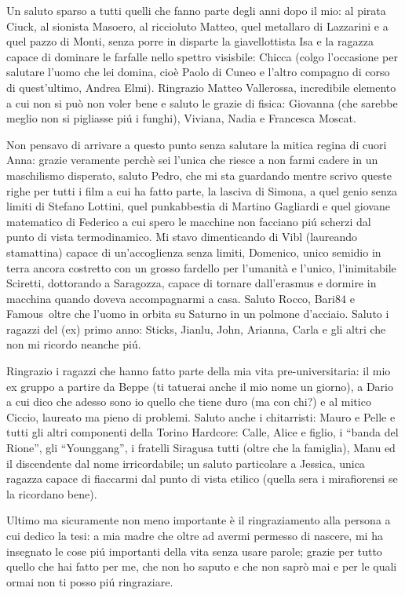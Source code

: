 \par 
Un saluto sparso a tutti quelli che fanno parte degli  anni dopo il mio: al pirata Ciuck, al sionista Masoero, al riccioluto Matteo, quel metallaro di Lazzarini e a quel pazzo di Monti, senza porre in disparte la giavellottista  Isa e la ragazza capace di dominare le farfalle nello spettro visisbile: Chicca (colgo l'occasione per salutare l'uomo che lei domina, cio\`e Paolo di Cuneo e l'altro compagno di corso di quest'ultimo, Andrea Elmi). Ringrazio Matteo Vallerossa, incredibile elemento a cui non si pu\`o non voler bene e saluto le grazie di fisica: Giovanna (che sarebbe meglio non si pigliasse pi\'u i funghi), Viviana, Nadia e Francesca Moscat.
\par
Non pensavo di arrivare a questo punto senza salutare la mitica regina di cuori Anna: grazie veramente perch\`e sei l'unica che riesce a non farmi cadere in un maschilismo disperato, saluto Pedro, che mi sta guardando mentre scrivo queste righe per tutti i film a cui ha fatto parte, la lasciva di Simona, a quel genio senza limiti di Stefano Lottini, quel punkabbestia di Martino Gagliardi e quel giovane matematico di Federico a cui spero le macchine non facciano pi\'u scherzi dal punto di vista termodinamico. Mi stavo dimenticando di Vibl (laureando stamattina) capace di un'accoglienza senza limiti, Domenico, unico semidio in terra ancora costretto con un grosso fardello per l'umanit\`a e l'unico, l'inimitabile Sciretti, dottorando a Saragozza, capace di tornare dall'erasmus e dormire in macchina quando doveva accompagnarmi a casa. Saluto Rocco, Bari$84$ e Famous\ oltre che l'uomo in orbita su Saturno in un polmone d'acciaio. Saluto i ragazzi del (ex) primo anno: Sticks, Jianlu, John, Arianna, Carla e gli altri che non mi ricordo neanche pi\'u.
\par
Ringrazio i ragazzi che hanno fatto parte della mia vita pre-universitaria: il mio ex gruppo a partire da Beppe (ti tatuerai anche il mio nome un giorno), a Dario a cui dico che adesso sono io quello che tiene duro (ma con chi?) e al mitico Ciccio, laureato ma pieno di problemi. Saluto anche i chitarristi: Mauro e Pelle e tutti gli altri componenti della Torino Hardcore: Calle, Alice e figlio, i ``banda del Rione'', gli ``Younggang'', i fratelli Siragusa tutti (oltre che la famiglia), Manu ed il discendente dal nome irricordabile; un saluto particolare a Jessica, unica ragazza capace di fiaccarmi dal punto di vista etilico (quella sera i mirafiorensi se la ricordano bene).
\par
\bigskip
Ultimo ma sicuramente non meno importante \`e il ringraziamento alla persona a cui dedico la tesi: a mia madre che oltre ad avermi  permesso di  nascere, mi ha insegnato le cose pi\'u importanti della vita senza usare parole; grazie per tutto quello che hai fatto per me, che non ho saputo e che non sapr\`o mai e per le quali ormai non ti posso pi\'u ringraziare.
\bigskip
\line{\hfill$\hbar$\hskip 1cm}
